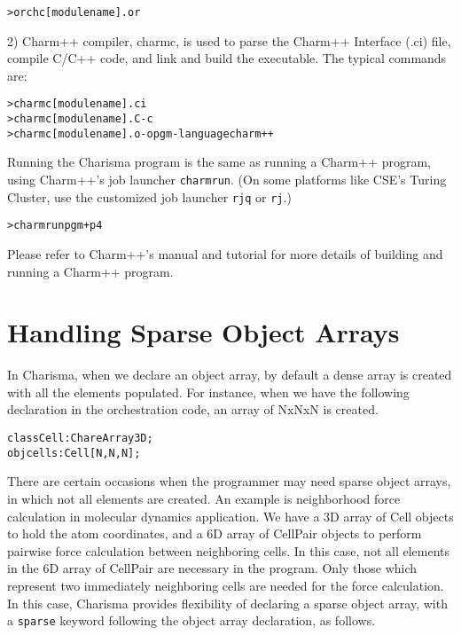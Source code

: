 \documentclass[10pt]{article}
\def\code#1{{\small {\tt {#1}}}}
\begin{document}
\begin{alltt}
    > orchc [modulename].or
\end{alltt}

2) Charm++ compiler, charmc, is used to parse the Charm++ Interface (.ci) file,
compile C/C++ code, and link and build the executable. The typical commands are:
\begin{alltt}
    > charmc [modulename].ci
    > charmc [modulename].C -c
    > charmc [modulename].o -o pgm -language charm++
\end{alltt}

Running the Charisma program is the same as running a Charm++ program, using
Charm++'s job launcher \code{charmrun}. (On some platforms like CSE's Turing 
Cluster, use the customized job launcher \code{rjq} or \code{rj}.) 

\begin{alltt}
    > charmrun pgm +p4
\end{alltt}

Please refer to Charm++'s manual and tutorial for more details of building 
and running a Charm++ program. 

\section{Handling Sparse Object Arrays}
\label{sec:sparse}

In Charisma, when we declare an object array, by default a dense array is
created with all the elements populated. For instance, when we have the
following declaration in the orchestration code, an array of NxNxN is created. 
\begin{alltt}
    class Cell : ChareArray3D;
    obj cells : Cell[N,N,N];
\end{alltt}

There are certain occasions when the programmer may need sparse object arrays,
in which not all elements are created. An example is neighborhood force
calculation in molecular dynamics application. We have a 3D array of Cell
objects to hold the atom coordinates, and a 6D array of CellPair objects to
perform pairwise force calculation between neighboring cells. In this case, not
all elements in the 6D array of CellPair are necessary in the program. Only
those which represent two immediately neighboring cells are needed for the
force calculation. In this case, Charisma provides flexibility of declaring a
sparse object array, with a \code{sparse} keyword following the object array
declaration, as follows.
\end{document}
